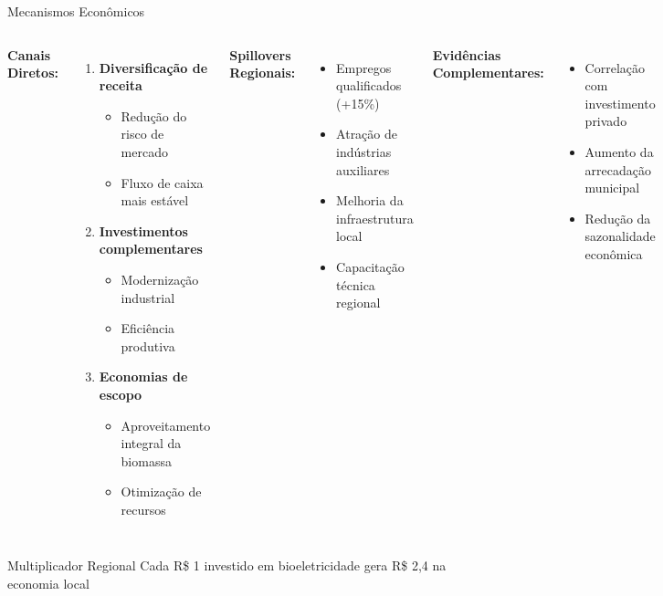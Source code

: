 \documentclass[10pt,aspectratio=169]{beamer}
\begin{document}
\begin{frame}{Mecanismos Econômicos}
\begin{columns}
\textbf{Canais Diretos:}
\begin{enumerate}
    \item \textbf{Diversificação de receita}
    \begin{itemize}
        \item Redução do risco de mercado
        \item Fluxo de caixa mais estável
    \end{itemize}
    
    \item \textbf{Investimentos complementares}
    \begin{itemize}
        \item Modernização industrial
        \item Eficiência produtiva
    \end{itemize}
    
    \item \textbf{Economias de escopo}
    \begin{itemize}
        \item Aproveitamento integral da biomassa
        \item Otimização de recursos
    \end{itemize}
\end{enumerate}

\textbf{Spillovers Regionais:}
\begin{itemize}
    \item Empregos qualificados (+15\%)
    \item Atração de indústrias auxiliares
    \item Melhoria da infraestrutura local
    \item Capacitação técnica regional
\end{itemize}

\textbf{Evidências Complementares:}
\begin{itemize}
    \item Correlação com investimento privado
    \item Aumento da arrecadação municipal
    \item Redução da sazonalidade econômica
\end{itemize}
\end{columns}

\begin{block}{Multiplicador Regional}
Cada R\$ 1 investido em bioeletricidade gera R\$ 2,4 na economia local
\end{block}
\end{frame}
\end{document}
